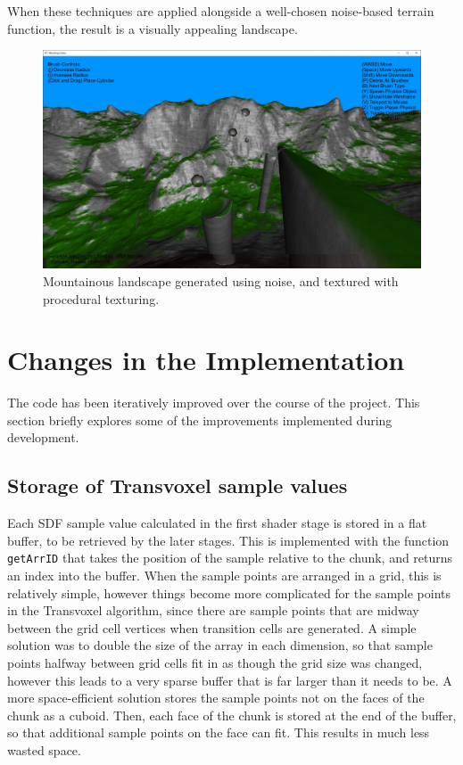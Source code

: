 \documentclass[11pt]{article}
\begin{document}
When these techniques are applied alongside a well-chosen noise-based terrain function, the result is a visually appealing landscape.
\begin{figure}[H]
  \includegraphics[width=\textwidth]{shaded_mountains.jpg}
  \caption{Mountainous landscape generated using noise, and textured with procedural texturing. }
  \label{fig:shaded_mountainsd}
\end{figure}


\section{Changes in the Implementation}
The code has been iteratively improved over the course of the project. This section briefly explores some of the improvements implemented during development.

\subsection{Storage of Transvoxel sample values}

Each SDF sample value calculated in the first shader stage is stored in a flat buffer, to be retrieved by the later stages. This is implemented with the function \texttt{getArrID} that takes the position of the sample relative to the chunk, and returns an index into the buffer. When the sample points are arranged in a grid, this is relatively simple, however things become more complicated for the sample points in the Transvoxel algorithm, since there are sample points that are midway between the grid cell vertices when transition cells are generated. A simple solution was to double the size of the array in each dimension, so that sample points halfway between grid cells fit in as though the grid size was changed, however this leads to a very sparse buffer that is far larger than it needs to be. A more space-efficient solution stores the sample points not on the faces of the chunk as a cuboid. Then, each face of the chunk is stored at the end of the buffer, so that additional sample points on the face can fit. This results in much less wasted space.
\end{document}
